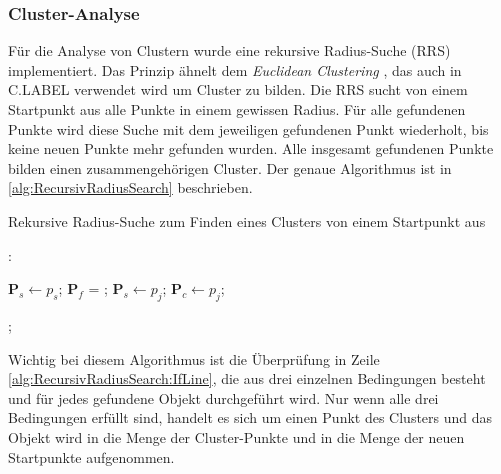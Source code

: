 \subsubsection{Cluster-Analyse}

Für die Analyse von Clustern wurde eine rekursive Radius-Suche (RRS) implementiert. Das Prinzip ähnelt dem \textit{Euclidean Clustering} \cite{bib:EuclideanCluster}, das auch in C.LABEL verwendet wird um Cluster zu bilden. Die RRS sucht von einem Startpunkt aus alle Punkte in einem gewissen Radius. Für alle gefundenen Punkte wird diese Suche mit dem jeweiligen gefundenen Punkt wiederholt, bis keine neuen Punkte mehr gefunden wurden. Alle insgesamt gefundenen Punkte bilden einen zusammengehörigen Cluster. Der genaue Algorithmus ist in \ref{alg:RecursivRadiusSearch} beschrieben.

\begin{algorithm}
  \caption{Rekursive Radius-Suche zum Finden eines Clusters von einem Startpunkt aus}
\label{alg:RecursivRadiusSearch}
  \begin{algorithmic}[1]
  	\State {}:
   	
	\State $\textbf{P}_{s} \gets p_s$;   	
    	\State $\textbf{P}_{f}$ = ;
			 \label{alg:RecursivRadiusSearch:IfLine}
				\State $\textbf{P}_s \gets p_j$;
				\State $\textbf{P}_c \gets p_j$;
			\EndIf
		 \EndFor
	\EndFor
	
		\State {};
	\EndIf
  \end{algorithmic}
\end{algorithm}

Wichtig bei diesem Algorithmus ist die Überprüfung in Zeile \ref{alg:RecursivRadiusSearch:IfLine}, die aus drei einzelnen Bedingungen besteht und für jedes gefundene Objekt durchgeführt wird. Nur wenn alle drei Bedingungen erfüllt sind, handelt es sich um einen Punkt des Clusters und das Objekt wird in die Menge der Cluster-Punkte und in die Menge der neuen Startpunkte aufgenommen. \\

